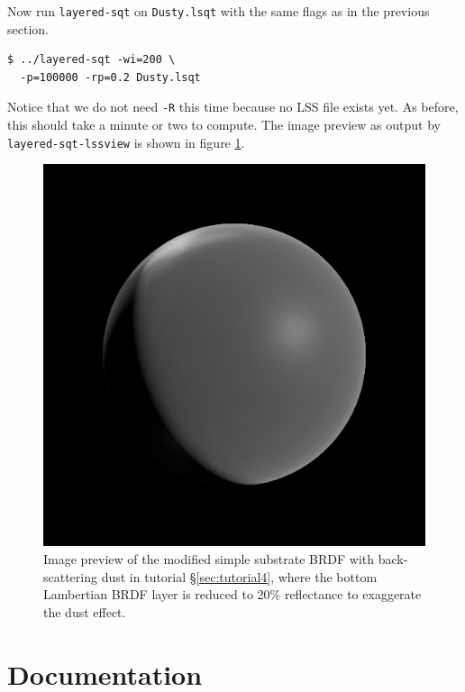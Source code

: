 \documentclass[
    twoside,
    twocolumn,
    letterpaper,
    10pt]{article}
\begin{document}
Now run \texttt{layered-sqt} on \texttt{Dusty.lsqt} with the same flags as in
the previous section.
\begin{verbatim}
$ ../layered-sqt -wi=200 \
  -p=100000 -rp=0.2 Dusty.lsqt
\end{verbatim}
Notice that we do not need \texttt{-R} this time because no LSS file 
exists yet. As before, this should take a minute or two to compute.
The image preview as output by \texttt{layered-sqt-lssview} is shown in
figure \ref{fig:tutorial4}.

\begin{figure}
\begin{center}
    \includegraphics[width=0.75\columnwidth]{tutorial4.png}
    \caption{Image preview of the modified simple substrate BRDF with 
    back-scattering
    dust in tutorial \S\ref{sec:tutorial4}, where the bottom Lambertian BRDF 
    layer is reduced to 20\% reflectance to exaggerate the dust effect.
    \label{fig:tutorial4}}
\end{center}
\end{figure}

\section{Documentation}
\label{sec:doc}
\end{document}

